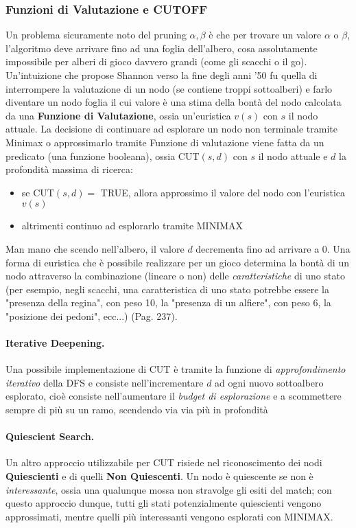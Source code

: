 \subsubsection{Funzioni di Valutazione e CUTOFF}
Un problema sicuramente noto del pruning $\alpha,\beta$ è che per trovare un valore $\alpha$ o $\beta$, l'algoritmo deve arrivare fino ad una foglia
dell'albero, cosa assolutamente impossibile per alberi di gioco davvero grandi (come gli scacchi o il go). Un'intuizione che propose Shannon
verso la fine degli anni '50 fu quella di interrompere la valutazione di un nodo (se contiene troppi sottoalberi) e farlo diventare un nodo foglia
il cui valore è una stima della bontà del nodo calcolata da una \textbf{Funzione di Valutazione}, ossia un'euristica $v(s)$ con $s$ il nodo attuale.
La decisione di continuare ad esplorare un nodo non terminale tramite Minimax o approssimarlo tramite Funzione di valutazione viene fatta da un predicato 
(una funzione booleana), ossia CUT$(s,d)$ con $s$ il nodo attuale e $d$ la profondità massima di ricerca:
\begin{itemize}
    \item se CUT$(s,d) = $ TRUE, allora approssimo il valore del nodo con l'euristica $v(s)$
    \item altrimenti continuo ad esplorarlo tramite MINIMAX
\end{itemize}
Man mano che scendo nell'albero, il valore $d$ decrementa fino ad arrivare a $0$.
Una forma di euristica che è possibile realizzare per un gioco determina la bontà di un nodo attraverso la combinazione (lineare o non) delle \textit{caratteristiche}
di uno stato (per esempio, negli scacchi, una caratteristica di uno stato potrebbe essere la "presenza della regina", con peso 10, la "presenza di un alfiere", con peso 6, la "posizione dei pedoni", ecc...) (Pag. 237).

\paragraph{Iterative Deepening.} Una possibile implementazione di CUT è tramite la funzione di \textit{approfondimento iterativo} della DFS e consiste nell'incrementare $d$
ad ogni nuovo sottoalbero esplorato, cioè consiste nell'aumentare il \textit{budget di esplorazione} e a scommettere sempre di più su un ramo, scendendo via via più in profondità

\paragraph{Quiescient Search.} Un altro approccio utilizzabile per CUT risiede nel riconoscimento dei nodi \textbf{Quiescienti} e di quelli \textbf{Non Quiescenti}.
Un nodo è quiescente se non è \textit{interessante}, ossia una qualunque mossa non stravolge gli esiti del match; con questo approccio dunque, tutti gli stati potenzialmente quiescienti vengono approssimati,
mentre quelli più interessanti vengono esplorati con MINIMAX.
